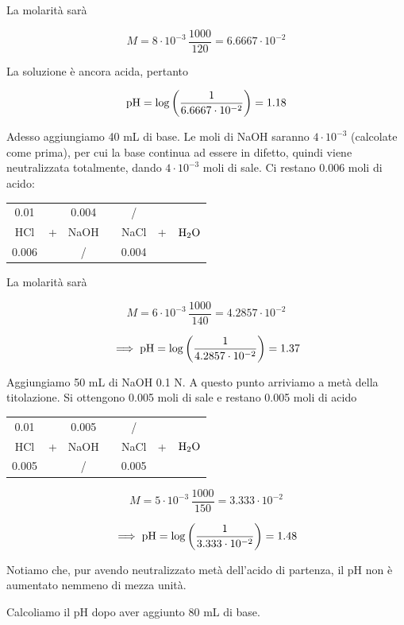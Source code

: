 La molarità sarà

$$M=8\cdot 10^{-3} \, \frac{1000}{120}=6.6667 \cdot 10^{-2}$$

La soluzione è ancora acida, pertanto

$$\rm pH=\log\left( \frac{1}{6.6667 \cdot 10^{-2}} \right)=1.18$$

Adesso aggiungiamo 40 mL di base. Le moli di NaOH saranno $4 \cdot 10^{-3}$ (calcolate come prima), per cui la base continua ad essere in difetto, quindi viene neutralizzata totalmente, dando $4 \cdot 10^{-3}$ moli di sale. Ci restano 0.006 moli di acido:

\begin{center}
    \begin{tabular}{ccccccc}
        0.01 &  & 0.004 & & / & &\\
        HCl & + & NaOH & \ce{->} & NaCl & + & $\rm H_2O$\\
        0.006 &  &  / & & 0.004 & &\\
    \end{tabular}
\end{center}

La molarità sarà

$$M=6\cdot 10^{-3} \, \frac{1000}{140}=4.2857\cdot 10^{-2}$$

$$\implies \rm pH=\log\left( \frac{1}{4.2857 \cdot 10^{-2}} \right)=1.37$$

Aggiungiamo 50 mL di NaOH 0.1 N. A questo punto arriviamo a metà della titolazione. Si ottengono 0.005 moli di sale e restano 0.005 moli di acido

\begin{center}
    \begin{tabular}{ccccccc}
        0.01 &  & 0.005 & & / & &\\
        HCl & + & NaOH & \ce{->} & NaCl & + & $\rm H_2O$\\
        0.005 &  &  / & & 0.005 & &\\
    \end{tabular}
\end{center}

$$M=5 \cdot 10^{-3} \, \frac{1000}{150}=3.333 \cdot 10^{-2}$$

$$\implies \rm pH = \log \left( \frac{1}{3.333 \cdot 10^{-2}} \right)=1.48$$

Notiamo che, pur avendo neutralizzato metà dell'acido di partenza, il pH non è aumentato nemmeno di mezza unità.

\vspace{0.2cm}Calcoliamo il pH dopo aver aggiunto 80 mL di base.

